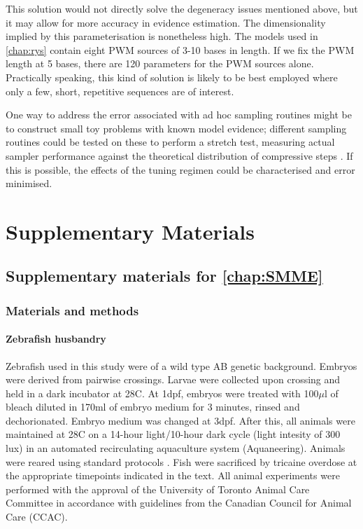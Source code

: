 \documentclass{ut-thesis}
\begin{document}
\begin{NoHyper}
This solution would not directly solve the degeneracy issues mentioned above, but it may allow for more accuracy in evidence estimation. The dimensionality implied by this parameterisation is nonetheless high. The models used in \autoref{chap:rys} contain eight PWM sources of 3-10 bases in length. If we fix the PWM length at 5 bases, there are 120 parameters for the PWM sources alone. Practically speaking, this kind of solution is likely to be best employed where only a few, short, repetitive sequences are of interest.

One way to address the error associated with ad hoc sampling routines might be to construct small toy problems with known model evidence; different sampling routines could be tested on these to perform a stretch test, measuring actual sampler performance against the theoretical distribution of compressive steps \cite{Buchner2016}. If this is possible, the effects of the  tuning regimen could be characterised and error minimised.
\part{Supplementary Materials}
\chapter{Supplementary materials for \autoref{chap:SMME}}
\label{chap:SMMsupp}
\section{Materials and methods}
\subsection{Zebrafish husbandry}
\label{ssec:husbandry}
Zebrafish used in this study were of a wild type AB genetic background. Embryos were derived from pairwise crossings. Larvae were collected upon crossing and held in a dark incubator at 28\textdegree C. At 1dpf, embryos were treated with 100$\mu$l of bleach diluted in 170ml of embryo medium for 3 minutes, rinsed and dechorionated. Embryo medium was changed at 3dpf. After this, all animals were maintained at 28\textdegree C on a 14-hour light/10-hour dark cycle (light intesity of 300 lux) in an automated recirculating aquaculture system (Aquaneering). Animals were reared using standard protocols \cite{Westerfield2000}. Fish were sacrificed by tricaine overdose at the appropriate timepoints indicated in the text. All animal experiments were performed with the approval of the University of Toronto Animal Care Committee in accordance with guidelines from the Canadian Council for Animal Care (CCAC).


\end{NoHyper}
\end{document}
